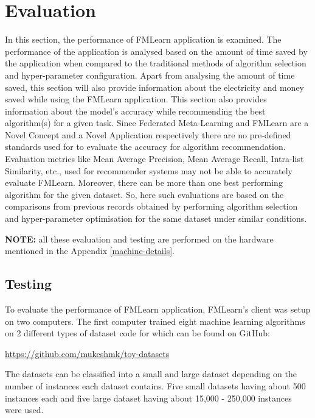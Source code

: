 \chapter{Evaluation}

In this section, the performance of FMLearn application is examined. The performance of the application is analysed based on the amount of time saved by the application when compared to the traditional methods of algorithm selection and hyper-parameter configuration. Apart from analysing the amount of time saved, this section will also provide information about the electricity and money saved while using the FMLearn application. This section also provides information about the model's accuracy while recommending the best algorithm(s) for a given task. Since Federated Meta-Learning and FMLearn are a Novel Concept and a Novel Application respectively there are no pre-defined standards used for to evaluate the accuracy for algorithm recommendation. Evaluation metrics like Mean Average Precision, Mean Average Recall, Intra-list Similarity, etc., used for recommender systems may not be able to accurately evaluate FMLearn. Moreover, there can be more than one best performing algorithm for the given dataset. So, here such evaluations are based on the comparisons from previous records obtained by performing algorithm selection and hyper-parameter optimisation for the same dataset under similar conditions.

\textbf{NOTE:} all these evaluation and testing are performed on the hardware mentioned in the Appendix \ref{machine-details}.

\section{Testing}

To evaluate the performance of FMLearn application, FMLearn's client was setup on two computers. The first computer trained eight machine learning algorithms on 2 different types of dataset code for which can be found on GitHub:
\begin{center}
    \href{https://github.com/mukeshmk/toy-datasets}{https://github.com/mukeshmk/toy-datasets}
\end{center}

The datasets can be classified into a small and large dataset depending on the number of instances each dataset contains. Five small datasets having about 500 instances each and five large dataset having about 15,000 - 250,000 instances were used.

